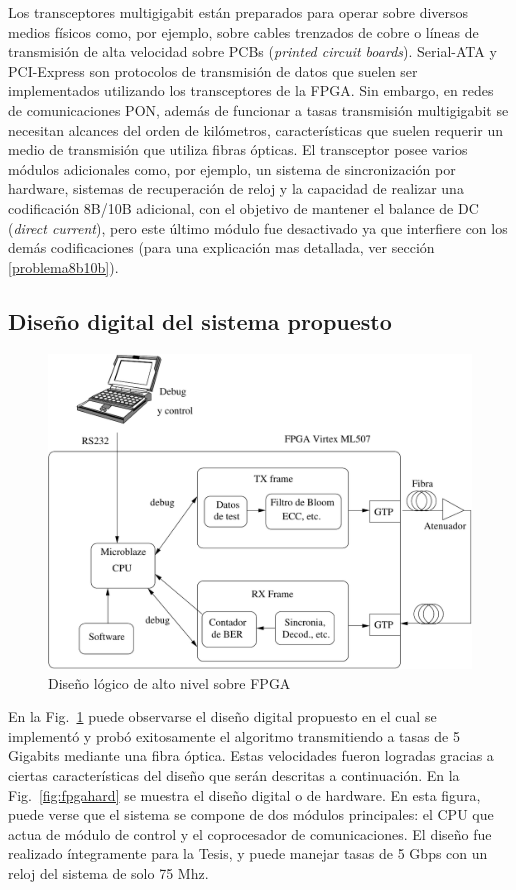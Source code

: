 Los transceptores multigigabit están preparados para operar sobre diversos medios físicos como, por ejemplo, sobre cables trenzados de cobre o líneas de transmisión de alta velocidad sobre PCBs (\textit{printed circuit boards}). Serial-ATA \cite{serial2001high} y PCI-Express \cite{budruk2004pci} son protocolos de transmisión de datos que suelen ser implementados utilizando los transceptores de la FPGA. Sin embargo, en redes de comunicaciones PON, además de funcionar a tasas transmisión  multigigabit se necesitan alcances del orden de kilómetros, características que suelen requerir un medio de transmisión que utiliza fibras ópticas.  El transceptor posee varios módulos adicionales como, por ejemplo, un sistema de sincronización por hardware, sistemas de recuperación de reloj y la capacidad de realizar una codificación 8B/10B \cite{widmer1983dc} adicional, con el objetivo de mantener el balance de DC (\textit{direct current}), pero este último módulo fue desactivado ya que interfiere con los demás codificaciones (para una explicación mas detallada, ver sección \ref{problema8b10b}).

\subsection{Diseño digital del sistema propuesto}
\begin{figure}[t]
  \centering
    \includegraphics[width=6in]{graphs/fpgadesign.pdf}
\caption {Diseño lógico de alto nivel sobre FPGA}
\label{fig:fpgadesign}
\end{figure}

En la Fig.~\ref{fig:fpgadesign} puede observarse el diseño digital propuesto en el cual se implementó y probó exitosamente el algoritmo transmitiendo a tasas de 5 Gigabits mediante una fibra óptica.
Estas velocidades fueron logradas gracias a ciertas características del diseño que serán descritas a continuación. En la Fig.~\ref{fig:fpgahard} se muestra el diseño digital o de hardware. En esta figura, puede verse que el sistema se compone de dos módulos principales: el CPU que actua de módulo de control y el coprocesador de comunicaciones. El diseño fue realizado íntegramente para la Tesis, y puede manejar tasas de 5 Gbps con un reloj del sistema de solo 75 Mhz.

